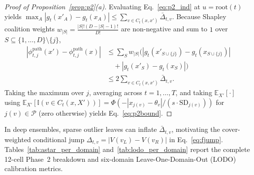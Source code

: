 \documentclass[conference]{IEEEtran}
\begin{document}
\begin{proof}[Proof of Proposition~\ref{prop:p2}(a)]
Evaluating Eq.~\eqref{eq:p2_ind} at $u = \mathrm{root}(t)$ yields $\max_A |g_t(x'_A) - g_t(x_A)| \le \sum_{v \in C_t(x,x')} \bar{\Delta}_{t,v}$. Because Shapley coalition weights $w_{|S|} = \frac{|S|!(D-|S|-1)!}{D!}$ are non-negative and sum to $1$ over $S \subseteq \{1,\dots,D\}\setminus\{j\}$,
\begin{equation}
\begin{aligned}
|\phi_{t,j}^{\mathrm{path}}(x') - \phi_{t,j}^{\mathrm{path}}(x)| &\le \sum_{S} w_{|S|} \big(|g_t(x'_{S\cup\{j\}}) - g_t(x_{S\cup\{j\}})| \\
&\quad + |g_t(x'_S) - g_t(x_S)|\big) \\
&\le 2 \sum_{v \in C_t(x,x')} \bar{\Delta}_{t,v}.
\end{aligned}
\end{equation}
Taking the maximum over $j$, averaging across $t=1,\dots,T$, and taking $\mathbb{E}_{X'}[\cdot]$ using $\mathbb{E}_{X'}[\mathbb{I}(v \in C_t(x, X'))] = \Phi(-|x_{j(v)}-\theta_v|/(s\cdot\mathrm{SD}_{j(v)}))$ for $j(v)\in\mathcal{P}$ (zero otherwise) yields Eq.~\eqref{eq:p2bound}.
\end{proof}

\noindent In deep ensembles, sparse outlier leaves can inflate $\bar{\Delta}_{t,v}$, motivating the cover-weighted conditional jump $\Delta_{t,v} = |V(v_L) - V(v_R)|$ in Eq.~\eqref{eq:fjump}. Tables~\ref{tab:astar_per_domain} and~\ref{tab:lodo_per_domain} report the complete 12-cell Phase~2 breakdown and six-domain Leave-One-Domain-Out (LODO) calibration metrics.
\end{document}
